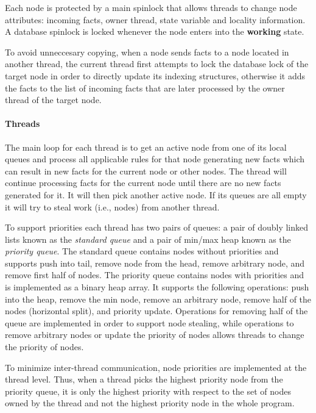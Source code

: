 Each node is protected by a main spinlock that allows threads to
change node attributes: incoming facts, owner thread, state variable
and locality information.  A database spinlock is locked whenever the
node enters into the \textbf{working} state.  

To avoid unneccesary copying, when a node sends facts to a node
located in another thread, the current thread first attempts to lock
the database lock of the target node in order to directly update its
indexing structures, otherwise it adds the facts to the list of
incoming facts that are later processed by the owner thread of the
target node.

\paragraph{Threads}

The main loop for each thread is to get an active node from one of its
local queues and process all applicable rules for that node generating
new facts which can result in new facts for the current node or other
nodes.  The thread will continue processing facts for the current node
until there are no new facts generated for it.  It will then pick
another active node.  If its queues are all empty it will try to steal
work (i.e., nodes) from another thread.

To support priorities each thread has two pairs of queues: a pair of
doubly linked lists known as the \emph{standard queue} and a pair of
min/max heap known as the \emph{priority queue}.  The standard queue
contains nodes without priorities and supports push into tail, remove
node from the head, remove arbitrary node, and remove first half of
nodes.  The priority queue contains nodes with priorities and is
implemented as a binary heap array. It supports the following
operations: push into the heap, remove the min node, remove an
arbitrary node, remove half of the nodes (horizontal split), and
priority update.  Operations for removing half of the queue are
implemented in order to support node stealing, while operations to
remove arbitrary nodes or update the priority of nodes allows threads
to change the priority of nodes.

To minimize inter-thread communication, node priorities are
implemented at the thread level. Thus, when a thread picks the highest
priority node from the priority queue, it is only the highest priority
with respect to the set of nodes owned by the thread and not the
highest priority node in the whole program.  

